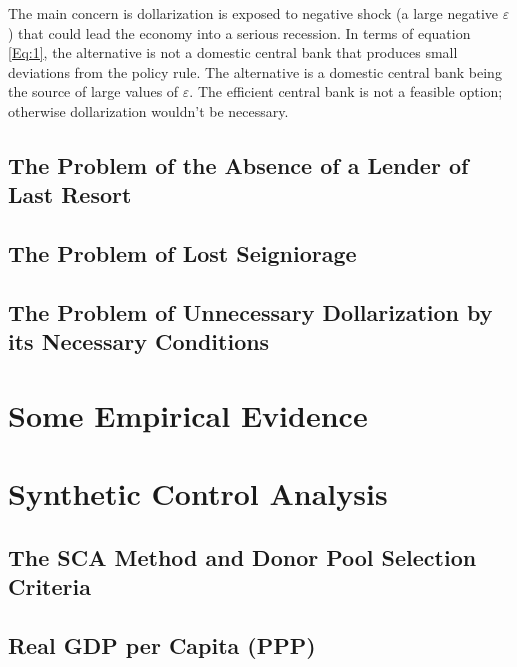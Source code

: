 \documentclass[12pt]{article}
\begin{document}
The main concern is dollarization is exposed to negative shock (a large negative $\varepsilon$) that could lead the economy into a serious recession. In terms of equation \ref{Eq:1}, the alternative is not a domestic central bank that produces small deviations from the policy rule. The alternative is a domestic central bank being the source of large values of $\varepsilon$. The efficient central bank is not a feasible option; otherwise dollarization wouldn't be necessary.




\subsection{The Problem of the Absence of a Lender of Last Resort}

\subsection{The Problem of Lost Seigniorage}

\subsection{The Problem of Unnecessary Dollarization by its Necessary Conditions}


\section{Some Empirical Evidence}

\section{Synthetic Control Analysis}

\subsection{The SCA Method and Donor Pool Selection Criteria}

\subsection{Real GDP per Capita (PPP)}
\end{document}
